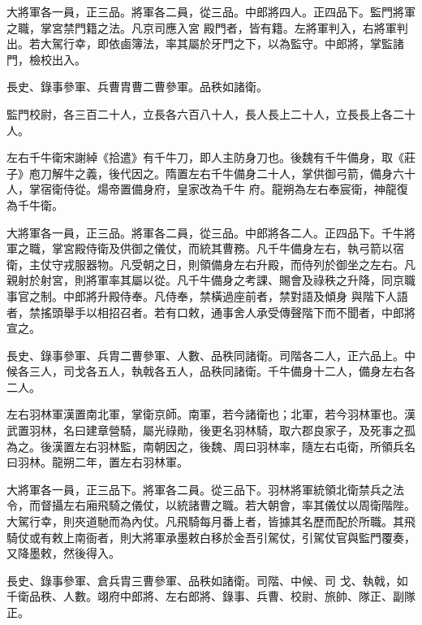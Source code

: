 \begin{pinyinscope}
 大將軍各一員，正三品。將軍各二員，從三品。中郎將四人。正四品下。監門將軍之職，掌宮禁門籍之法。凡京司應入宮
 殿門者，皆有籍。左將軍判入，右將軍判出。若大駕行幸，即依鹵簿法，率其屬於牙門之下，以為監守。中郎將，掌監諸門，檢校出入。



 長史、錄事參軍、兵曹胄曹二曹參軍。品秩如諸衛。



 監門校尉，各三百二十人，立長各六百八十人，長人長上二十人，立長長上各二十人。



 左右千牛衛宋謝綽《拾遣》有千牛刀，即人主防身刀也。後魏有千牛備身，取《莊子》庖刀解牛之義，後代因之。隋置左右千牛備身二十人，掌供御弓箭，備身六十人，掌宿衛侍從。煬帝置備身府，皇家改為千牛
 府。龍朔為左右奉宸衛，神龍復為千牛衛。



 大將軍各一員，正三品。將軍各二員，從三品。中郎將各二人。正四品下。千牛將軍之職，掌宮殿侍衛及供御之儀仗，而統其曹務。凡千牛備身左右，執弓箭以宿衛，主仗守戎服器物。凡受朝之日，則領備身左右升殿，而侍列於御坐之左右。凡親射於射宮，則將軍率其屬以從。凡千牛備身之考課、賜會及祿秩之升降，同京職事官之制。中郎將升殿侍奉。凡侍奉，禁橫過座前者，禁對語及傾身
 與階下人語者，禁搖頭舉手以相招召者。若有口敕，通事舍人承受傳聲階下而不聞者，中郎將宣之。



 長史、錄事參軍、兵胄二曹參軍、人數、品秩同諸衛。司階各二人，正六品上。中候各三人，司戈各五人，執戟各五人，品秩同諸衛。千牛備身十二人，備身左右各二人。



 左右羽林軍漢置南北軍，掌衛京師。南軍，若今諸衛也；北軍，若今羽林軍也。漢武置羽林，名曰建章營騎，屬光祿勛，後更名羽林騎，取六郡良家子，及死事之孤為之。後漢置左右羽林監，南朝因之，後魏、周曰羽林率，隨左右屯衛，所領兵名曰羽林。龍朔二年，置左右羽林軍。



 大將軍各一員，正三品下。將軍各二員。從三品下。羽林將軍統領北衛禁兵之法令，而督攝左右廂飛騎之儀仗，以統諸曹之職。若大朝會，率其儀仗以周衛階陛。大駕行幸，則夾道馳而為內仗。凡飛騎每月番上者，皆據其名歷而配於所職。其飛騎仗或有敕上南衙者，則大將軍承墨敕白移於金吾引駕仗，引駕仗官與監門覆奏，又降墨敕，然後得入。



 長史、錄事參軍、倉兵胄三曹參軍、品秩如諸衛。司階、中候、司
 戈、執戟，如千衛品秩、人數。翊府中郎將、左右郎將、錄事、兵曹、校尉、旅帥、隊正、副隊正。




\end{pinyinscope}
